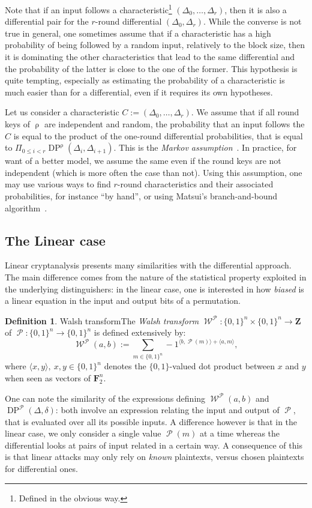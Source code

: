 \documentclass[11pt,a4paper]{article}
\theoremstyle{definition}
\newtheorem{defi}{Definition}
\theoremstyle{theorem}
\DeclareMathOperator\Perm{\mathcal{P}}
\DeclareMathOperator\Walsh{\mathcal{W}}
\DeclareMathOperator\rf{\rho}
\DeclareMathOperator\DP{\mathrm{DP}}
\newcommand\msb{\{0,1\}^n}
\begin{document}
Note that if an input follows a characteristic\footnote{Defined in the obvious way.} $(\Delta_0,\ldots,\Delta_r)$, then it is also a differential pair for the $r$-round
differential $(\Delta_0,\Delta_r)$. While the converse is not true in general, one sometimes assume that if a characteristic
has a high probability of being followed by a random input, relatively to the block size, then it is dominating the other characteristics
that lead to the same differential and the probability of the latter is close to the one of the former. This hypothesis is quite tempting,
especially as estimating the probability of a characteristic is much easier than for a differential, even if it requires its own hypotheses. 

Let us consider a characteristic $C := (\Delta_0,\ldots,\Delta_r)$. We assume that if all round keys of $\rf$ are independent and random,
the probability that an input follows the $C$ is equal to the product of the one-round differential probabilities, that is
equal to $\Pi_{0\leq i < r} \DP^{\rf}(\Delta_i,\Delta_{i+1})$. This is the \emph{Markov assumption}~\cite{DBLP:conf/eurocrypt/LaiM91}. In practice, for want of
a better model, we assume the same even if the round keys are not independent (which is more often the case than not).
Using this assumption, one may use various ways to find $r$-round characteristics and their associated probabilities, for instance
``by hand'', or using Matsui's branch-and-bound algorithm~\cite{DBLP:conf/eurocrypt/Matsui94}.


\subsection{The Linear case}

Linear cryptanalysis presents many similarities with the differential approach. The main difference comes from the nature of the statistical
property exploited in the underlying distinguishers: in the linear case, one is interested in how \emph{biased} is a linear equation in the input
and output bits of a permutation. 
\begin{defi}{Walsh transform}\label{def:walsh}
The \emph{Walsh transform} $\Walsh^{\Perm} : \msb \times \msb \rightarrow \mathbf{Z}$ of $\Perm : \msb \rightarrow \msb$ is defined extensively by:
\[
\Walsh^{\Perm}(a,b) := \sum_{m \in \msb} -1^{\langle b, \Perm(m)\rangle + \langle a, m \rangle},
\]
where $\langle x, y\rangle,~x,y \in \msb$ denotes the $\{0,1\}$-valued dot product between $x$ and $y$ when seen as vectors of $\mathbf{F}_2^n$.
\end{defi}
One can note the similarity of the expressions defining $\Walsh^{\Perm}(a,b)$ and $\DP^{\Perm}(\Delta,\delta)$: both involve an expression
relating the input and output of $\Perm$, that is evaluated over all its possible inputs. A difference however is that in the linear case,
we only consider a single value $\Perm(m)$ at a time whereas the differential looks at pairs of input related in a certain way. A consequence
of this is that linear attacks may only rely on \emph{known} plaintexts, versus chosen plaintexts for differential ones.
\end{document}
